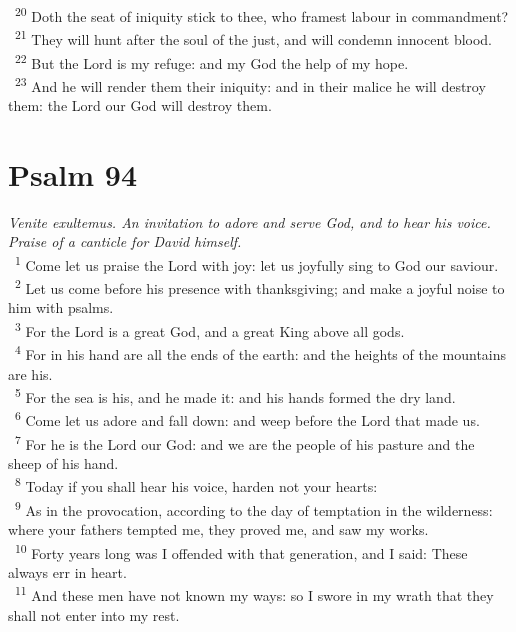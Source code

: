 \documentclass[a5paper,12pt]{article}
\begin{document}
\begin{multicols*}{2}
~\textsuperscript{20} Doth the seat of iniquity stick to thee, who framest labour in commandment?\\
~\textsuperscript{21} They will hunt after the soul of the just, and will condemn innocent blood.\\
~\textsuperscript{22} But the Lord is my refuge: and my God the help of my hope.\\
~\textsuperscript{23} And he will render them their iniquity: and in their malice he will destroy them: the Lord our God will destroy them.\\

\section{Psalm 94}
\label{sec:orgb33c74c}
\emph{Venite exultemus. An invitation to adore and serve God, and to hear his voice. Praise of a canticle for David himself.}\\

~\textsuperscript{1} Come let us praise the Lord with joy: let us joyfully sing to God our saviour.\\
~\textsuperscript{2} Let us come before his presence with thanksgiving; and make a joyful noise to him with psalms.\\
~\textsuperscript{3} For the Lord is a great God, and a great King above all gods.\\
~\textsuperscript{4} For in his hand are all the ends of the earth: and the heights of the mountains are his.\\
~\textsuperscript{5} For the sea is his, and he made it: and his hands formed the dry land.\\
~\textsuperscript{6} Come let us adore and fall down: and weep before the Lord that made us.\\
~\textsuperscript{7} For he is the Lord our God: and we are the people of his pasture and the sheep of his hand.\\
~\textsuperscript{8} Today if you shall hear his voice, harden not your hearts:\\
~\textsuperscript{9} As in the provocation, according to the day of temptation in the wilderness: where your fathers tempted me, they proved me, and saw my works.\\
~\textsuperscript{10} Forty years long was I offended with that generation, and I said: These always err in heart.\\
~\textsuperscript{11} And these men have not known my ways: so I swore in my wrath that they shall not enter into my rest.\\


\end{multicols*}
\end{document}
